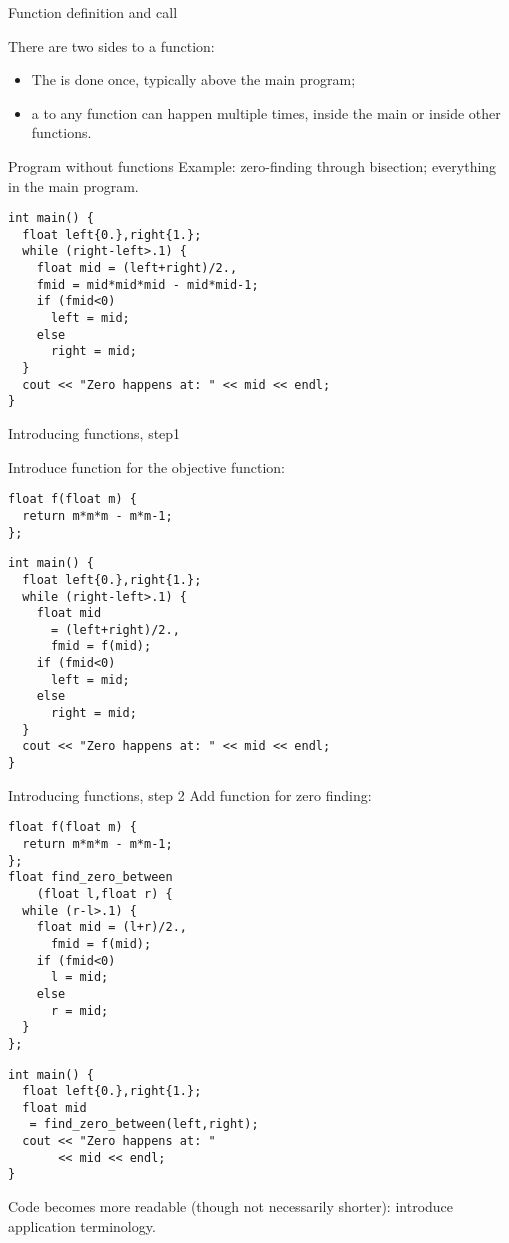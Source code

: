  {Function definition and call}

There are two sides to a function:
\begin{itemize}
\item
  The  is done once, typically
  above the main program;
\item a  to any function can happen
  multiple times, inside the main or inside other functions.
\end{itemize}

\begin{block}{Program without functions}
  \label{sl:nodef-nocall}
Example: zero-finding through bisection; 
  everything in the main program.

\begin{lstlisting}
int main() {
  float left{0.},right{1.};
  while (right-left>.1) {
    float mid = (left+right)/2.,
    fmid = mid*mid*mid - mid*mid-1;
    if (fmid<0)
      left = mid;
    else
      right = mid;  
  }
  cout << "Zero happens at: " << mid << endl;
}
\end{lstlisting}

\end{block}

\begin{block}{Introducing functions, step1}
  \label{sl:def-call1}
  \begin{multicols}{2}
Introduce function for the objective function:
\begin{lstlisting}
float f(float m) {
  return m*m*m - m*m-1;
};
\end{lstlisting}
\vfill\columnbreak
\begin{lstlisting}
int main() {
  float left{0.},right{1.};
  while (right-left>.1) {
    float mid
      = (left+right)/2.,
      fmid = f(mid);
    if (fmid<0)
      left = mid;
    else
      right = mid;  
  }
  cout << "Zero happens at: " << mid << endl;
}
\end{lstlisting}
  \end{multicols}
\end{block}

\begin{block}{Introducing functions, step 2}
  \label{sl:def-call2}
  Add function for zero finding:
  \begin{multicols}{2}
\begin{lstlisting}
float f(float m) {
  return m*m*m - m*m-1;
};
float find_zero_between
    (float l,float r) {
  while (r-l>.1) {
    float mid = (l+r)/2.,
      fmid = f(mid);
    if (fmid<0)
      l = mid;
    else
      r = mid;  
  }
};
\end{lstlisting}
\columnbreak
\begin{lstlisting}
int main() {
  float left{0.},right{1.};
  float mid
   = find_zero_between(left,right);
  cout << "Zero happens at: "
       << mid << endl;
}
\end{lstlisting}
\vfill
  \end{multicols}
Code becomes more readable (though not necessarily shorter): introduce
application terminology.
\end{block}

